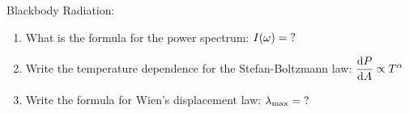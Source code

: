 

\vspace*{\fill}
\centering

Blackbody Radiation:
\begin{enumerate}
    \item What is the formula for the power spectrum: $I(\omega) = {\rm ?}$ 
    \item Write the temperature dependence for the Stefan-Boltzmann law: $\displaystyle \dv{P}{A} \propto T^{\alpha}$
    \item Write the formula for Wien's displacement law: $\lambda_{\rm max} = {\rm ?}$
\end{enumerate}

\centering
\vspace*{\fill}

